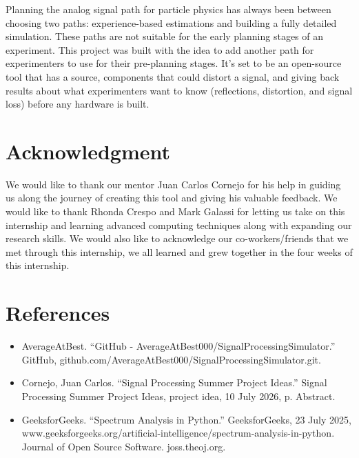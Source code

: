 \documentclass[10pt]{article}
\begin{document}
Planning the analog signal path for particle physics has always been between choosing two paths: experience-based estimations and building a fully detailed simulation. These paths are not suitable for the early planning stages of an experiment. This project was built with the idea to add another path for experimenters to use for their pre-planning stages. It's set to be an open-source tool that has a source, components that could distort a signal, and giving back results about what experimenters want to know (reflections, distortion, and signal loss) before any hardware is built.

\section{Acknowledgment}

We would like to thank our mentor Juan Carlos Cornejo for his help in guiding us along the journey of creating this tool and giving his valuable feedback. We would like to thank Rhonda Crespo and Mark Galassi for letting us take on this internship and learning advanced computing techniques along with expanding our research skills. We would also like to acknowledge our co-workers/friends that we met through this internship, we all learned and grew together in the four weeks of this internship.

\section{References}

\begin{itemize}
\small
\item AverageAtBest. “GitHub - AverageAtBest000/SignalProcessingSimulator.” GitHub, github.com/AverageAtBest000/SignalProcessingSimulator.git. 

\item Cornejo, Juan Carlos. “Signal Processing Summer Project Ideas.” Signal Processing Summer Project Ideas, project idea, 10 July 2026, p. Abstract. 

\item GeeksforGeeks. “Spectrum Analysis in Python.” GeeksforGeeks, 23 July 2025, www.geeksforgeeks.org/artificial-intelligence/spectrum-analysis-in-python. Journal of Open Source Software. joss.theoj.org.
\end{itemize}
\end{document}
